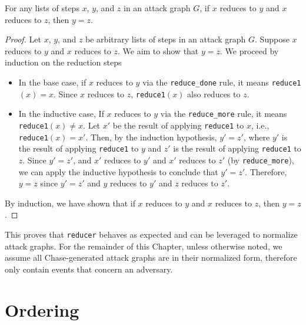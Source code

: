 \documentclass[runningheads]{llncs}
\theoremstyle{definition}
\newcommand{\squash}{\itemsep=0pt\parskip=0pt}
\begin{document}
\begin{theorem}
    For any lists of steps $x$, $y$, and $z$ in an attack graph $G$, if $x$ reduces to $y$ and $x$ reduces to $z$, then $y=z$.
\end{theorem}
\begin{proof}
Let $x$, $y$, and $z$ be arbitrary lists of steps in an attack graph $G$. Suppose $x$ reduces to $y$ and $x$ reduces to $z$. We aim to show that $y = z$. We proceed by induction on the reduction steps

\begin{itemize}
    \squash
    \item In the base case, if $x$ reduces to $y$ via the \texttt{reduce\_done} rule, it means \texttt{reduce1}$(x) = x$. Since $x$ reduces to $z$, \texttt{reduce1}$(x)$  also reduces to $z$.
    \item In the inductive case, If $x$ reduces to $y$ via the \texttt{reduce\_more} rule, it means \texttt{reduce1}$(x) \neq x$. Let $x'$ be the result of applying \texttt{reduce1} to $x$, i.e., \texttt{reduce1}$(x)= x'$. Then, by the induction hypothesis, $y' = z'$, where $y'$ is the result of applying \texttt{reduce1} to $y$ and $z'$ is the result of applying \texttt{reduce1} to $z$. Since $y' = z'$, and $x'$ reduces to $y'$ and $x'$ reduces to $z'$ (by \texttt{reduce\_more}), we can apply the inductive hypothesis to conclude that $y' = z'$. Therefore, $y = z$ since $y' = z'$ and $y$ reduces to $y'$ and $z$ reduces to $z'$.
\end{itemize}

By induction, we have shown that if $x$ reduces to $y$ and $x$ reduces to $z$, then $y = z$.
\end{proof}

\noindent This proves that \texttt{reducer} behaves as expected and can be leveraged to normalize attack graphs. For the remainder of this Chapter, unless otherwise noted, we assume all Chase-generated attack graphs are in their normalized form, therefore only contain events that concern an adversary.

\section{Ordering}
\end{document}
